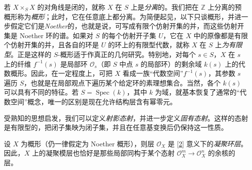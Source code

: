 \par{}若 \(X\times _S X\) 的对角线是闭的，就称 \(X\) 在 \(S\) 上是\emph{分离}的。我们把在 \(\mathbb {Z}\) 上分离的预概形称为\emph{概形}；此时，它在任意底上都分离。为简便起见，以下只谈概形，并进一步假定它们是\emph{Noether}的，也就是说，可写成有限个仿射开集的并，而这些仿射开集是 Noether 环的谱。如果对 \(S\) 的每个仿射开子集 \(U\)，它在 \(X\) 中的原像都是有限个仿射开集的并，且各自的环是 \(U\) 的环上的有限型代数，就称 \(X\) 在 \(S\) 上\emph{为有限型}。正是这样的 \(S\)-概形适于作真正的几何研究。特别地，对每个 \(s\in  S\)，\(X\) 在 \(s\) 上的纤维 \(f^{-1}(s)\) 是局部环 \(\mathcal {O}_s\)（即 \(S\) 中点 \(s\) 的局部环）的剩余域 \(k(s)\) 上的代数概形。因此，在一定程度上，可把 \(X\) 看成一族“代数空间”\(f^{-1}(s)\)，其参数 \(s\) 遍历 \(S\)，也就是在局部观点下遍历某个给定环的素理想集合。当然，各个 \(k(s)\) 可以具有不同的特征。若 \(S=\operatorname {Spec}(k)\)，其中 \(k\) 为域，就基本恢复了通常的“代数空间”概念，唯一的区别是现在允许结构层含有幂零元。
\par{}受熟知的思想启发，我们可以定义\emph{射影态射}，并进一步定义\emph{固有态射}。这样的态射是有限型的，把闭子集映为闭子集，并且在任意基变换后仍保持这一性质。
\par{}设 \(X\) 为概形（仍一律假定为 Noether 概形），则层 \(\mathcal {O}_X\) 是 \hyperref[Gro1960]{[2]} 意义下的\emph{凝聚环层}。因此，\(X\) 上的凝聚模层也恰好是那些局部同构于某个态射 \(\mathcal {O}_X^m\to \mathcal {O}_X^n\) 的余核的层。
